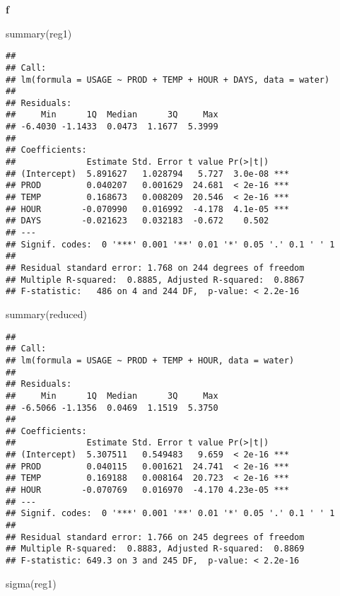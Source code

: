\documentclass[
]{article}
\newenvironment{Shaded}{\begin{snugshade}}{\end{snugshade}}
\newcommand{\FunctionTok}[1]{\textcolor[rgb]{0.00,0.00,0.00}{#1}}
\newcommand{\NormalTok}[1]{#1}
\begin{document}
\textbf{f}

\begin{Shaded}
\begin{Highlighting}[]
\FunctionTok{summary}\NormalTok{(reg1)}
\end{Highlighting}
\end{Shaded}

\begin{verbatim}
## 
## Call:
## lm(formula = USAGE ~ PROD + TEMP + HOUR + DAYS, data = water)
## 
## Residuals:
##     Min      1Q  Median      3Q     Max 
## -6.4030 -1.1433  0.0473  1.1677  5.3999 
## 
## Coefficients:
##              Estimate Std. Error t value Pr(>|t|)    
## (Intercept)  5.891627   1.028794   5.727  3.0e-08 ***
## PROD         0.040207   0.001629  24.681  < 2e-16 ***
## TEMP         0.168673   0.008209  20.546  < 2e-16 ***
## HOUR        -0.070990   0.016992  -4.178  4.1e-05 ***
## DAYS        -0.021623   0.032183  -0.672    0.502    
## ---
## Signif. codes:  0 '***' 0.001 '**' 0.01 '*' 0.05 '.' 0.1 ' ' 1
## 
## Residual standard error: 1.768 on 244 degrees of freedom
## Multiple R-squared:  0.8885, Adjusted R-squared:  0.8867 
## F-statistic:   486 on 4 and 244 DF,  p-value: < 2.2e-16
\end{verbatim}

\begin{Shaded}
\begin{Highlighting}[]
\FunctionTok{summary}\NormalTok{(reduced)}
\end{Highlighting}
\end{Shaded}

\begin{verbatim}
## 
## Call:
## lm(formula = USAGE ~ PROD + TEMP + HOUR, data = water)
## 
## Residuals:
##     Min      1Q  Median      3Q     Max 
## -6.5066 -1.1356  0.0469  1.1519  5.3750 
## 
## Coefficients:
##              Estimate Std. Error t value Pr(>|t|)    
## (Intercept)  5.307511   0.549483   9.659  < 2e-16 ***
## PROD         0.040115   0.001621  24.741  < 2e-16 ***
## TEMP         0.169188   0.008164  20.723  < 2e-16 ***
## HOUR        -0.070769   0.016970  -4.170 4.23e-05 ***
## ---
## Signif. codes:  0 '***' 0.001 '**' 0.01 '*' 0.05 '.' 0.1 ' ' 1
## 
## Residual standard error: 1.766 on 245 degrees of freedom
## Multiple R-squared:  0.8883, Adjusted R-squared:  0.8869 
## F-statistic: 649.3 on 3 and 245 DF,  p-value: < 2.2e-16
\end{verbatim}

\begin{Shaded}
\begin{Highlighting}[]
\FunctionTok{sigma}\NormalTok{(reg1)}
\end{Highlighting}
\end{Shaded}
\end{document}
